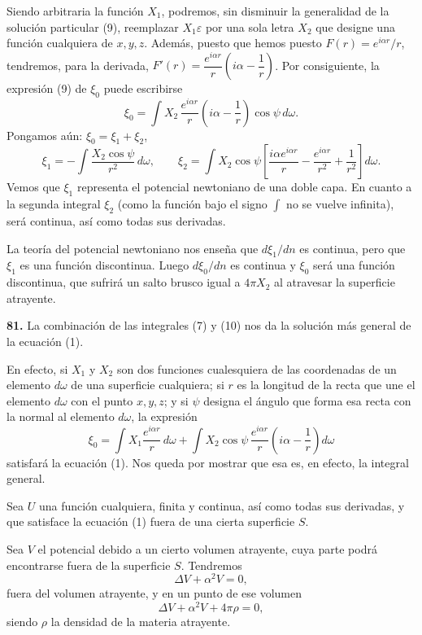 Siendo arbitraria la función $X_1$, podremos, sin disminuir la generalidad
de la solución particular (9), reemplazar $X_1\varepsilon$ por una sola
letra $X_2$ que designe una función cualquiera de $x,y,z$. Además, puesto
que hemos puesto $F(r)=e^{i\alpha r}/r$, tendremos, para la derivada,
$F'(r)=\dfrac{e^{i\alpha r}}{r}\left(i\alpha-\dfrac1r\right)$. Por
consiguiente, la expresión (9) de $\xi_0$ puede escribirse
\begin{equation}
\xi_0 = \int X_2\,\frac{e^{i\alpha r}}{r}\left(i\alpha-\frac1r\right)
\cos\psi\,d\omega.
\tag{10}
\end{equation}
Pongamos aún: $\xi_0=\xi_1+\xi_2$,
\[
\xi_1 = -\int \frac{X_2\cos\psi}{r^2}\,d\omega,\qquad
\xi_2 = \int X_2\cos\psi\left[\frac{i\alpha e^{i\alpha r}}{r} -
\frac{e^{i\alpha r}}{r^2} + \frac{1}{r^2}\right]d\omega.
\]
Vemos que $\xi_1$ representa el potencial newtoniano de una doble capa. En
cuanto a la segunda integral $\xi_2$ (como la función bajo el signo $\int$
no se vuelve infinita), será continua, así como todas sus derivadas.

La teoría del potencial newtoniano nos enseña que $d\xi_1/dn$ es continua,
pero que $\xi_1$ es una función discontinua. Luego $d\xi_0/dn$ es continua
y $\xi_0$ será una función discontinua, que sufrirá un salto brusco igual
a $4\pi X_2$ al atravesar la superficie atrayente.

\noindent\textbf{81.} La combinación de las integrales (7) y (10) nos da
la solución más general de la ecuación (1).

En efecto, si $X_1$ y $X_2$ son dos funciones cualesquiera de las
coordenadas de un elemento $d\omega$ de una superficie cualquiera; si $r$
es la longitud de la recta que une el elemento $d\omega$ con el punto
$x,y,z$; y si $\psi$ designa el ángulo que forma esa recta con la normal
al elemento $d\omega$, la expresión
\begin{equation}
\xi_0 = \int X_1\frac{e^{i\alpha r}}{r}\,d\omega +
\int X_2\cos\psi\,\frac{e^{i\alpha r}}{r}\left(i\alpha-\frac1r\right)d\omega
\tag{11}
\end{equation}
satisfará la ecuación (1). Nos queda por mostrar que esa es, en efecto, la
integral general.

Sea $U$ una función cualquiera, finita y continua, así como todas sus
derivadas, y que satisface la ecuación (1) fuera de una cierta superficie
$S$.

Sea $V$ el potencial debido a un cierto volumen atrayente, cuya parte
podrá encontrarse fuera de la superficie $S$. Tendremos
\begin{equation}
\Delta V+\alpha^2V=0,
\tag{12}
\end{equation}
fuera del volumen atrayente, y en un punto de ese volumen
\begin{equation}
\Delta V+\alpha^2V+4\pi\rho=0,
\tag{13}
\end{equation}
siendo $\rho$ la densidad de la materia atrayente.

